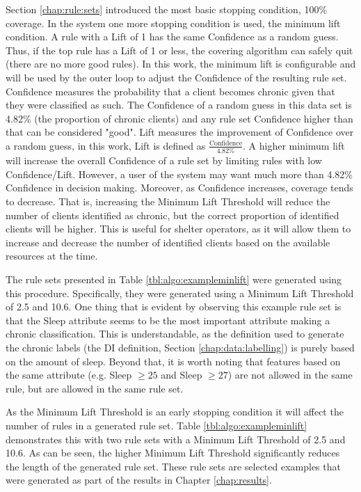 Section \ref{chap:rule:sets} introduced the most basic stopping condition, 100\% coverage. In the \Abb system one more stopping condition is used, the minimum lift condition. A rule with a Lift of 1 has the same Confidence as a random guess. Thus, if the top rule has a Lift of 1 or less, the covering algorithm can safely quit (there are no more good rules). In this work, the minimum lift is configurable and will be used by the outer loop to adjust the Confidence of the resulting rule set. Confidence measures the probability that a client becomes chronic given that they were classified as such. The Confidence of a random guess in this data set is 4.82\% (the proportion of chronic clients) and any rule set Confidence higher than that can be considered "good". Lift measures the improvement of Confidence over a random guess, in this work, Lift is defined as $\frac{\text{Confidence}}{4.82\%}$. A higher minimum lift will increase the overall Confidence of a rule set by limiting rules with low Confidence/Lift.
However, a user of the system may want much more than 4.82\% Confidence in decision making. Moreover, as Confidence increases, coverage tends to decrease. That is, increasing the Minimum Lift Threshold will reduce the number of clients identified as chronic, but the correct proportion of identified clients will be higher. This is useful for shelter operators, as it will allow them to increase and decrease the number of identified clients based on the available resources at the time.

The rule sets presented in Table \ref{tbl:algo:exampleminlift} were generated using this procedure. Specifically, they were generated using a Minimum Lift Threshold of 2.5 and 10.6. One thing that is evident by observing this example rule set is that the Sleep attribute seems to be the most important attribute making a chronic classification. This is understandable, as the definition used to generate the chronic labels (the DI definition, Section \ref{chap:data:labelling}) is purely based on the amount of sleep. Beyond that, it is worth noting that features based on the same attribute (e.g. Sleep $\geq 25$ and Sleep $\geq 27$) are not allowed in the same rule, but are allowed in the same rule set.

As the Minimum Lift Threshold is an early stopping condition it will affect the number of rules in a generated rule set. Table \ref{tbl:algo:exampleminlift} demonstrates this with two rule sets with a Minimum Lift Threshold of 2.5 and 10.6. As can be seen, the higher Minimum Lift Threshold significantly reduces the length of the generated rule set. These rule sets are selected examples that were generated as part of the results in Chapter \ref{chap:results}.

